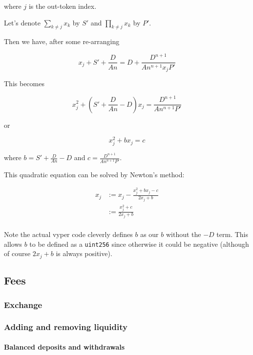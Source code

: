 \documentclass[
]{article}
\begin{document}
where \(j\) is the out-token index.

Let's denote \(\sum_{k\neq j} x_k\) by \(S'\) and
\(\prod_{k\neq j} x_k\) by \(P'\).

Then we have, after some re-arranging

\[ x_j + S' + \frac{D}{An} = D + \frac{D^{n+1}}{An^{n+1} x_j P'} \]

This becomes

\[ x_j^2 + \left(S' + \frac{D}{An} - D\right) x_j = \frac{D^{n+1}}{An^{n+1}P'}\]

or

\[ x_j^2 + bx_j = c\]

where \(b = S' + \frac{D}{An} - D\) and
\(c = \frac{D^{n+1}}{An^{n+1}P'}\).

This quadratic equation can be solved by Newton's method:

\[ \begin{aligned}
x_j &:= x_j - \frac{x_j^2 + bx_j - c}{2x_j + b}\\
&:= \frac{x_j^2 + c}{2x_j + b} \\
\end{aligned} \]

Note the actual vyper code cleverly defines \(b\) as our \(b\) without
the \(-D\) term. This allows \(b\) to be defined as a \texttt{uint256}
since otherwise it could be negative (although of course \(2x_j + b\) is
always positive).

\hypertarget{fees}{%
\subsection{Fees}\label{fees}}

\hypertarget{exchange}{%
\subsubsection{Exchange}\label{exchange}}

\hypertarget{adding-and-removing-liquidity}{%
\subsubsection{Adding and removing
liquidity}\label{adding-and-removing-liquidity}}

\hypertarget{balanced-deposits-and-withdrawals}{%
\paragraph{Balanced deposits and
withdrawals}\label{balanced-deposits-and-withdrawals}}
\end{document}
